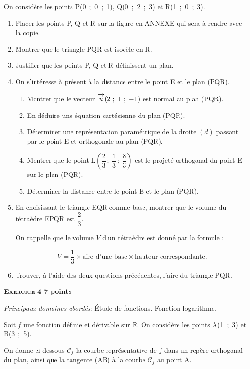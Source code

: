 \documentclass[11pt]{article}
\newcommand{\R}{\mathbb{R}}
\newcommand{\vect}[1]{\overrightarrow{\,\mathstrut#1\,}}
\begin{document}
On considère les points P(0~;~0~;~1), Q(0~;~2~;~3) et R(1~;~0~;~3).

\medskip

\begin{enumerate}
\item Placer les points P{}, Q et R sur la figure en ANNEXE qui sera à rendre avec la copie.
\item Montrer que le triangle PQR est isocèle en R.
\item Justifier que les points P{}, Q et R définissent un plan.
\item On s'intéresse à présent à la distance entre le point E et le plan (PQR).
	\begin{enumerate}
		\item Montrer que le vecteur $\vect{u}(2~;~1~;~- 1)$ est normal au plan (PQR).
		\item En déduire une équation cartésienne du plan (PQR).
		\item Déterminer une représentation paramétrique de la droite $(d)$ passant par le point E et orthogonale au plan (PQR).
		\item Montrer que le point L$\left(\dfrac23~;~\dfrac13~;~\dfrac83\right)$ est le projeté orthogonal du point E sur le plan (PQR).
		\item Déterminer la distance entre le point E et le plan (PQR).
	\end{enumerate}
\item En choisissant le triangle EQR comme base, montrer que le volume du tétraèdre EPQR est $\dfrac23$.

On rappelle que le volume $V$ d'un tétraèdre est donné par la formule : 

\[V = \dfrac13 \times \text{aire d'une base} \times \text{hauteur correspondante}.\]

\item Trouver, à l'aide des deux questions précédentes, l'aire du triangle PQR.
\end{enumerate}

\bigskip

\textbf{\textsc{Exercice 4} \hfill 7 points}

\medskip

\emph{Principaux domaines abordés}: Étude de fonctions. Fonction logarithme.

\bigskip

Soit $f$ une fonction définie et dérivable sur $\R$. On considère les points A(1~;~3) et B(3~;~5).

On donne ci-dessous $\mathcal{C}_f$ la courbe représentative de $f$ dans un repère orthogonal du plan, ainsi que la tangente (AB) à la courbe $\mathcal{C}_f$ au point A.
\end{document}
